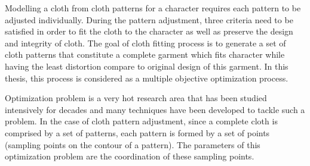 Modelling a cloth from cloth patterns for a character requires each pattern to be adjusted individually. During the pattern adjustment, three criteria need to be satisfied in order to fit the cloth to the character as well as preserve the design and integrity of cloth. The goal of cloth fitting process is to generate a set of cloth patterns that constitute a complete garment which fits character while having the least distortion compare to original design of this garment. In this thesis, this process is considered as a multiple objective optimization process. 

Optimization problem is a very hot research area that has been studied intensively for decades and many techniques have been developed to tackle such a problem. In the case of cloth pattern adjustment, since a complete cloth is comprised by a set of patterns, each pattern is formed by a set of points (sampling points on the contour of a pattern). The parameters of this optimization problem are the coordination of these sampling points. 

%

